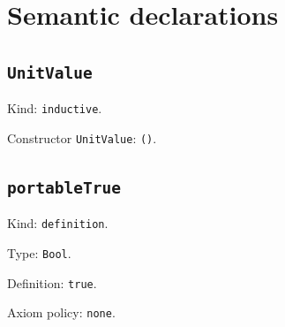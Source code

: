 \documentclass[11pt]{article}
\begin{document}
\section*{Semantic declarations}
\subsection*{\texttt{UnitValue}}
\noindent Kind: \texttt{inductive}.\par
\noindent Constructor \texttt{UnitValue}: \texttt{()}.\par
\subsection*{\texttt{portableTrue}}
\noindent Kind: \texttt{definition}.\par
\noindent Type: \texttt{Bool}.\par
\noindent Definition: \texttt{true}.\par
\noindent Axiom policy: \texttt{none}.\par
\end{document}
